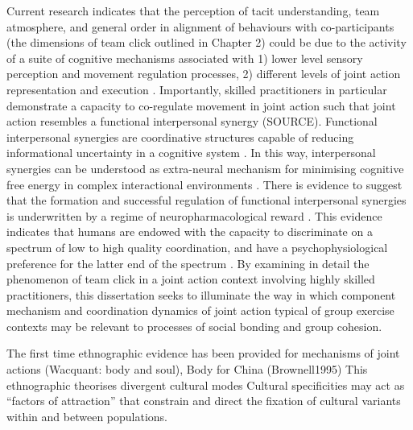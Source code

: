 Current research indicates that the perception of tacit understanding, team atmosphere, and general order in alignment of behaviours with co-participants (the dimensions of team click outlined in Chapter 2) could be due to the activity of a suite of cognitive mechanisms associated with 1) lower level sensory perception and movement regulation processes, 2) different levels of joint action representation and execution \citep{Semin2008,Frith2008,Pesquita2017}.
Importantly, skilled practitioners in particular demonstrate a capacity to co-regulate movement in joint action such that joint action resembles a functional interpersonal synergy (SOURCE).  Functional interpersonal synergies are coordinative structures capable of reducing informational uncertainty in a cognitive system \citep{Riley2011}. In this way, interpersonal synergies can be understood as extra-neural mechanism for minimising cognitive free energy in complex interactional environments \citep{Clark2013}. There is evidence to suggest that the formation and successful regulation of functional interpersonal synergies is underwritten by a regime of neuropharmacological reward \citep{Ross2013}. This evidence indicates that humans are endowed with the capacity to discriminate on a spectrum of low to high quality coordination, and have a psychophysiological preference for the latter end of the spectrum \citep{Marsh2009}.  By examining in detail the phenomenon of team click in a joint action context involving highly skilled practitioners, this dissertation seeks to illuminate the way in which component mechanism and coordination dynamics of joint action typical of group exercise contexts may be relevant to processes of social bonding and group cohesion.




The first time ethnographic evidence has been provided for mechanisms of joint actions (Wacquant: body and soul), Body for China (Brownell1995)
This ethnographic theorises divergent cultural modes
Cultural specificities may act as ``factors of attraction'' \citep{Sperber2014} that constrain and direct the fixation of cultural variants within and between populations.







